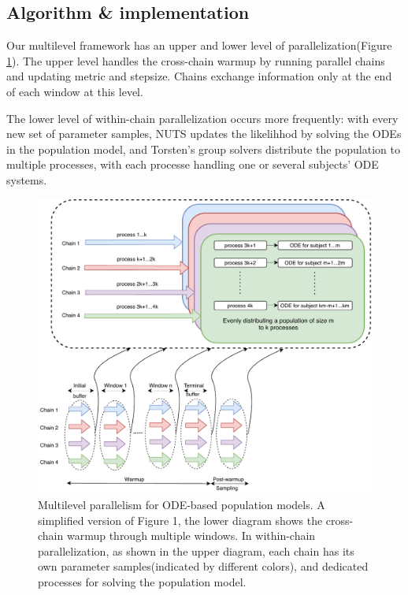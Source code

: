 \documentclass[11pt, reqno, oneside]{amsart}
\begin{document}
\subsection{Algorithm \& implementation}
\label{sec:org7d1fe53}
Our multilevel framework has an upper and lower level of parallelization(Figure \ref{multilevel-diagram}). The upper
level handles the cross-chain warmup by running parallel chains and
updating metric and stepsize. Chains exchange
information only at the end of each window at this level. 

The lower level of within-chain parallelization occurs more
frequently: with every new set of parameter samples, NUTS updates the likelihhod
by solving the ODEs in the population model, and Torsten's group
solvers distribute the population to multiple processes, with each
processe handling one or several subjects' ODE systems.

\begin{figure}[htbp]
\centering
\includegraphics[width=\textwidth]{./figure/within_chain_parallel_diagram.pdf}
\caption{Multilevel parallelism for ODE-based population models. A simplified version of Figure 1, the lower diagram shows the cross-chain warmup through multiple windows. In within-chain parallelization, as shown in the upper diagram, each chain has its own parameter samples(indicated by different colors), and dedicated processes for solving the population model. \label{multilevel-diagram}}
\end{figure}
\end{document}
